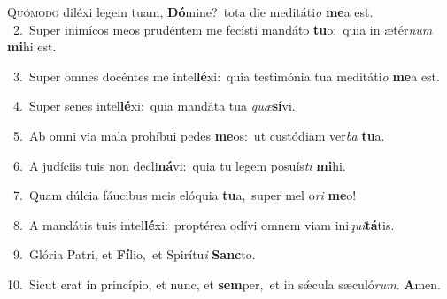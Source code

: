 \lettrine{\initial\textcolor{\initialcolor}{Q}}{uómodo} diléxi legem tuam, \textbf{Dó}\-mine?~\star tota die meditáti\textit{o} \textbf{me}\-a est.\\
{\numbfont\textcolor{\numbcolor}{~2.}}~Super inimícos meos prudéntem me fecísti mandáto \textbf{tu}\-o:~\star quia in ætér\textit{num} \textbf{mi}\-hi est.\par
{\numbfont\textcolor{\numbcolor}{~3.}}~Super omnes docéntes me intel\-\textbf{lé}\-xi:~\star quia testimónia tua meditáti\textit{o} \textbf{me}\-a est.\par
{\numbfont\textcolor{\numbcolor}{~4.}}~Super senes intel\-\textbf{lé}\-xi:~\star quia mandáta tua \textit{quæ}\-\textbf{sí}vi.\par
{\numbfont\textcolor{\numbcolor}{~5.}}~Ab omni via mala prohíbui pedes \textbf{me}\-os:~\star ut custódiam ver\textit{ba} \textbf{tu}\-a.\par
{\numbfont\textcolor{\numbcolor}{~6.}}~A judíciis tuis non decli\-\textbf{ná}\-vi:~\star quia tu legem posuís\textit{ti} \textbf{mi}\-hi.\par
{\numbfont\textcolor{\numbcolor}{~7.}}~Quam dúlcia fáucibus meis elóquia \textbf{tu}\-a,~\star super mel o\textit{ri} \textbf{me}\-o!\par
{\numbfont\textcolor{\numbcolor}{~8.}}~A mandátis tuis intel\-\textbf{lé}\-xi:~\star proptérea odívi omnem viam ini\-\textit{qui}\-\textbf{tá}tis.\par
{\numbfont\textcolor{\numbcolor}{~9.}}~Glória Patri, et \textbf{Fí}\-lio,~\star et Spirítu\textit{i} \textbf{Sanc}\-to.\par
{\numbfont\textcolor{\numbcolor}{10.}}~Sicut erat in princípio, et nunc, et \textbf{sem}\-per,~\star et in sǽcula sæculó\-\textit{rum}\-. \textbf{A}\-men.\par
